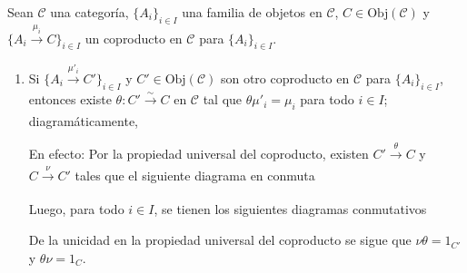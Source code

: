 \documentclass[tesis]{subfiles}
\begin{document}
\begin{Obs} \label{Mendoza-1.8.3}
    Sean $\mathscr{C}$ una categoría, $\{A_i\}_{i\in I}$ una familia de objetos en $\mathscr{C}$, $C\in\text{Obj}(\mathscr{C})$ y $\{A_i\xrightarrow[]{\mu_i} C\}_{i\in I}$ un coproducto en $\mathscr{C}$ para $\{A_i\}_{i\in I}$.

    \begin{enumerate}[label=(\arabic*)]

        \item Si $\{A_i\xrightarrow[]{\mu'_i} C'\}_{i\in I}$ y $C'\in\text{Obj}(\mathscr{C})$ son otro coproducto en $\mathscr{C}$ para $\{A_i\}_{i\in I}$, entonces existe $\theta:C'\xrightarrow[]{\sim} C$ en $\mathscr{C}$ tal que $\theta\mu'_i = \mu_i$ para todo $i\in I$; diagramáticamente,
            \begin{center}
            \end{center}

            En efecto: Por la propiedad universal del coproducto, existen $C'\xrightarrow[]{\theta} C$ y $C\xrightarrow[]{\nu} C'$ tales que el siguiente diagrama en conmuta
            \begin{center}
            \end{center}
            Luego, para todo $i\in I$, se tienen los siguientes diagramas conmutativos
            \begin{center}
            \end{center}
            De la unicidad en la propiedad universal del coproducto se sigue que $\nu\theta=1_{C'}$ y $\theta\nu=1_C$.


\end{enumerate}
\end{Obs}
\end{document}
